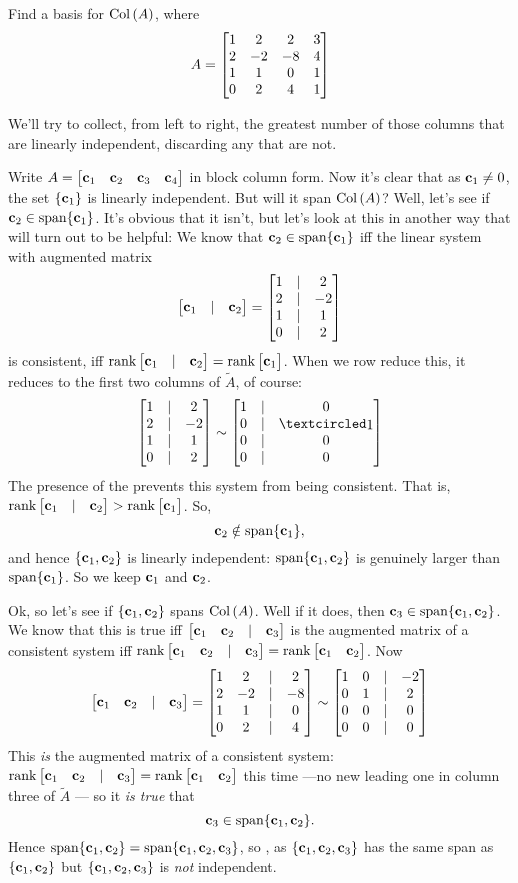 \begin{myprob} \label{colspaceexample}Find a basis for $\col(A)$, where 
$$A = \mat{
1&2&2&3\\2&-2&-8&4\\1&1&0&1\\0&2&4&1}
$$
\begin{mysol}
We'll try to collect, from left to right, the greatest number of  those columns that are linearly independent, discarding any that are not.

Write $A= \mat{\cc_1&\cc_2&\cc_3&\cc_4}$ in block column form. Now it's clear that as $\cc_1\not=0$, the set $\set{\cc_1}$ is linearly independent. But will it span $\col(A)$? Well, let's see if $\cc_2\in \spn\{\cc_1\}$. It's obvious that it isn't, but let's look at this  in another way  that will turn out to be helpful:
We know that $\cc_2\in \spn\{\cc_1\}$ iff the linear system with augmented matrix 
$$ \mat{\cc_1&|&\cc_2}=
\mat{
1&|&2\\
2&|&-2\\
1&|&1\\
0&|&2}$$ is consistent, iff $\rank\mat{\cc_1&|&\cc_2}=\rank\mat{\cc_1}$. When we row reduce this, it reduces to the first two columns of $\tilde A$, of course:
$$\mat{
1&|&2\\
2&|&-2\\
1&|&1\\
0&|&2}  \sim \mat{1 &|&0\\ 0 &|& \pivot\\ 0 &|& 0 \\ 0 &|& 0 }$$The presence of the  prevents this system from being consistent. That is, $\rank\mat{\cc_1&|&\cc_2}>\rank\mat{\cc_1}$. So,  $$\cc_2\notin \spn\{\cc_1\},$$ and hence  $\set{\cc_1, \cc_2}$ is linearly independent: $\spn\{\cc_1, \cc_2\}$ is genuinely larger than  $\spn\{\cc_1\}$. So we keep $\cc_1$ and $\cc_2$.

Ok, so let's see if $\set{\cc_1, \cc_2}$ spans $\col(A)$. Well if it does, then $\cc_3 \in \spn\{\cc_1, \cc_2\}$. We know that this is true iff 
$\mat{\cc_1&\cc_2&|&\cc_3} $ is the augmented matrix of a consistent system iff $\rank\mat{\cc_1&\cc_2&|&\cc_3}=\rank\mat{\cc_1&\cc_2}$. Now
$$ \mat{\cc_1&\cc_2&|&\cc_3}=\mat{
1&2&|&2\\2&-2&|&-8\\1&1&|&0\\0&2&|&4}\sim\mat{1 & 0 &|& -2 \\ 0 & 1 &|& 2 \\ 0 & 0 &|& 0 \\ 0 & 0 &|& 0 } $$ This {\it is} the augmented matrix of a consistent system: $\rank\mat{\cc_1&\cc_2&|&\cc_3}=\rank\mat{\cc_1&\cc_2}$ this time ---no new leading one in column three of $\tilde A$ --- so it {\it is true} that $$\cc_3 \in \spn\{\cc_1, \cc_2\}.$$ Hence $\spn\{\cc_1, \cc_2\}=\spn\{\cc_1, \cc_2, \cc_3\}$, so , as  $\set{\cc_1, \cc_2, \cc_3}$ has the same span as $\set{\cc_1, \cc_2}$ but $\set{\cc_1, \cc_2, \cc_3}$ is {\it not} independent.


\end{mysol}
\end{myprob}
